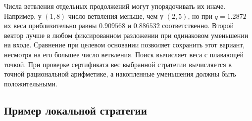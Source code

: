 \documentclass[10pt,twoside]{article}
\theoremstyle{definition}
\theoremstyle{remark}
\begin{document}
Числа ветвления отдельных продолжений могут упорядочивать их иначе.
Например, у $(1,8)$ число ветвления меньше, чем у $(2,5)$, но при
$q=1.2872$ их веса приблизительно равны $0.909568$ и $0.886532$
соответственно. Второй вектор лучше в любом фиксированном разложении при
одинаковом уменьшении на входе. Сравнение при целевом основании позволяет
сохранить этот вариант, несмотря на его большее число ветвления. Поиск
вычисляет веса с плавающей точкой. При проверке сертификата вес выбранной
стратегии вычисляется в точной рациональной арифметике, а накопленные
уменьшения должны быть положительными.

\subsection{Пример локальной стратегии}
\end{document}
